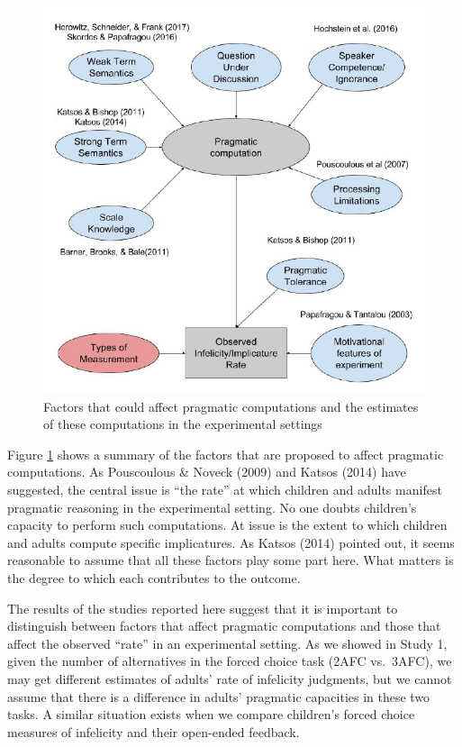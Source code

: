 \documentclass[floatsintext,man]{apa6}
\theoremstyle{definition}
\theoremstyle{definition}
\theoremstyle{definition}
\theoremstyle{remark}
\begin{document}
\begin{figure}
\centering
\includegraphics{figs/implicatureGraph-1.pdf}
\caption{\label{fig:implicatureGraph}Factors that could affect pragmatic
computations and the estimates of these computations in the experimental
settings}
\end{figure}

Figure \ref{fig:implicatureGraph} shows a summary of the factors that
are proposed to affect pragmatic computations. As Pouscoulous \& Noveck
(2009) and Katsos (2014) have suggested, the central issue is
\enquote{the rate} at which children and adults manifest pragmatic
reasoning in the experimental setting. No one doubts children's capacity
to perform such computations. At issue is the extent to which children
and adults compute specific implicatures. As Katsos (2014) pointed out,
it seems reasonable to assume that all these factors play some part
here. What matters is the degree to which each contributes to the
outcome.

The results of the studies reported here suggest that it is important to
distinguish between factors that affect pragmatic computations and those
that affect the observed \enquote{rate} in an experimental setting. As
we showed in Study 1, given the number of alternatives in the forced
choice task (2AFC vs.~3AFC), we may get different estimates of adults'
rate of infelicity judgments, but we cannot assume that there is a
difference in adults' pragmatic capacities in these two tasks. A similar
situation exists when we compare children's forced choice measures of
infelicity and their open-ended feedback.
\end{document}
